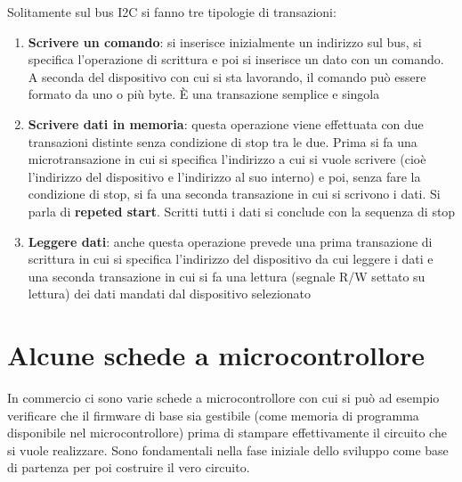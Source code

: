 \documentclass[12pt, a4paper]{report}
\begin{document}
Solitamente sul bus I2C si fanno tre tipologie di transazioni:
\begin{enumerate}
    \item\textbf{Scrivere un comando}: si inserisce inizialmente un indirizzo sul bus, si specifica l'operazione di scrittura e poi si inserisce un dato con un comando. A seconda del dispositivo con cui si sta lavorando, il comando può essere formato da uno o più byte. È una transazione semplice e singola
    \item\textbf{Scrivere dati in memoria}: questa operazione viene effettuata con due transazioni distinte senza condizione di stop tra le due. Prima si fa una microtransazione in cui si specifica l'indirizzo a cui si vuole scrivere (cioè l'indirizzo del dispositivo e l'indirizzo al suo interno) e poi, senza fare la condizione di stop, si fa una seconda transazione in cui si scrivono i dati. Si parla di \textbf{repeted start}. Scritti tutti i dati si conclude con la sequenza di stop
    \item\textbf{Leggere dati}: anche questa operazione prevede una prima transazione di scrittura in cui si specifica l'indirizzo del dispositivo da cui leggere i dati e una seconda transazione in cui si fa una lettura (segnale R/W settato su lettura) dei dati mandati dal dispositivo selezionato 
\end{enumerate}

\section{Alcune schede a microcontrollore}
In commercio ci sono varie schede a microcontrollore con cui si può ad esempio verificare che il firmware di base sia gestibile (come memoria di programma disponibile nel microcontrollore) prima di stampare effettivamente il circuito che si vuole realizzare. Sono fondamentali nella fase iniziale dello sviluppo come base di partenza per poi costruire il vero circuito.
\end{document}
